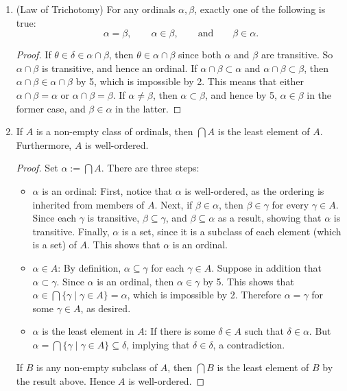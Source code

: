 \documentclass[12pt]{article}
\begin{document}
\begin{enumerate}
\begin{proof}
\end{proof}
\item (Law of Trichotomy) For any ordinals $\alpha,\beta$, exactly one of the following is true: $$\alpha=\beta,\qquad \alpha \in \beta,\qquad \mbox{and}\qquad \beta \in \alpha.$$
\begin{proof}  If $\theta\in \delta\in \alpha\cap \beta$, then $\theta\in \alpha\cap \beta$ since both $\alpha$ and $\beta$ are transitive.  So $\alpha\cap\beta$ is transitive, and hence an ordinal.  If $\alpha\cap \beta \subset \alpha$ and $\alpha\cap \beta \subset \beta$, then $\alpha\cap \beta \in \alpha\cap \beta$ by 5, which is impossible by 2.  This means that either $\alpha\cap \beta=\alpha$ or $\alpha\cap \beta=\beta$.  If $\alpha\ne \beta$, then $\alpha \subset \beta$, and hence by 5, $\alpha\in\beta$ in the former case, and $\beta \in \alpha$ in the latter.
\end{proof}
\item If $A$ is a non-empty class of ordinals, then $\bigcap A$ is the least element of $A$.  Furthermore, $A$ is well-ordered.
\begin{proof}  Set $\alpha:=\bigcap A$.  There are three steps: 
\begin{itemize}
\item $\alpha$ is an ordinal:  First, notice that $\alpha$ is well-ordered, as the ordering is inherited from members of $A$.  Next, if $\beta\in \alpha$, then $\beta\in \gamma$ for every $\gamma \in A$.  Since each $\gamma$ is transitive, $\beta\subseteq \gamma$, and $\beta\subseteq \alpha$ as a result, showing that $\alpha$ is transitive.  Finally, $\alpha$ is a set, since it is a subclass of each element (which is a set) of $A$.  This shows that $\alpha$ is an ordinal.
\item $\alpha \in A$:  By definition, $\alpha\subseteq \gamma$ for each $\gamma\in A$.  Suppose in addition that $\alpha\subset \gamma$.  Since $\alpha$ is an ordinal, then $\alpha\in \gamma$ by 5.  This shows that $\alpha \in \bigcap\lbrace \gamma\mid \gamma\in A\rbrace = \alpha$, which is impossible by 2.  Therefore $\alpha=\gamma$ for some $\gamma \in A$, as desired.
\item $\alpha$ is the least element in $A$:  If there is some $\delta \in A$ such that $\delta \in \alpha$.  But $\alpha = \bigcap \lbrace \gamma \mid \gamma \in A\rbrace \subseteq \delta$, implying that $\delta\in \delta$, a contradiction.
\end{itemize}
If $B$ is any non-empty subclass of $A$, then $\bigcap B$ is the least element of $B$ by the result above.  Hence $A$ is well-ordered.

\end{proof}
\end{enumerate}
\end{document}
